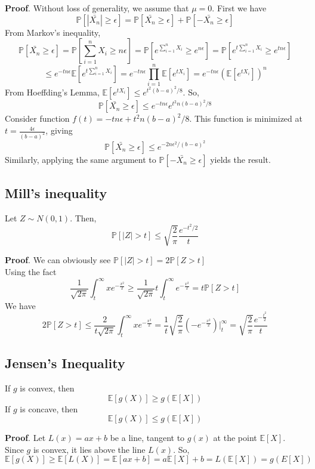 \documentclass[10pt]{article}
\begin{document}
\textbf{Proof}. Without loss of generality, we assume that $\mu=0$. First we have
\[ \mathbb{P}[|\bar{X_n}| \geqslant \epsilon] = \mathbb{P}[\bar{X_n} \geqslant \epsilon]  + \mathbb{P}[-\bar{X_n} \geqslant \epsilon]\] 
From Markov's inequality,
\[ \mathbb{P}[\bar{X_n} \geqslant \epsilon] = \mathbb{P}[\sum_{i=1}^{n} X_i \geqslant n\epsilon] = \mathbb{P}[e^{\sum_{i=1}^{n} X_i} \geqslant e^{n\epsilon}] = \mathbb{P}[e^{t\sum_{i=1}^{n} X_i} \geqslant e^{tn\epsilon}]\]
\[ \leqslant e^{-tn\epsilon} \mathbb{E}[e^{t\sum_{i=1}^{n} X_i}] =  e^{-tn\epsilon} \prod_{i=1}^{n} \mathbb{E}[e^{tX_i}] = e^{-tn\epsilon}  (\mathbb{E}[e^{tX_i}])^n\]
From Hoeffding's Lemma, $\mathbb{E}[e^{tX_i}] \leqslant e^{t^2 (b-a)^2 /8}$. So,
\[ \mathbb{P}[\bar{X_n} \geqslant \epsilon] \leqslant e^{-tn\epsilon}e^{t^2n(b-a)^2 /8}\]
Consider function $f(t) = -tn\epsilon + t^2n(b-a)^2/8$. This function is minimized at $t = \frac{4\epsilon}{(b-a)^2}$, giving
\[ \mathbb{P}[\bar{X_n} \geqslant \epsilon] \leqslant e^{-2n\epsilon^2/(b-a)^2}  \]
Similarly, applying the same argument to $\mathbb{P}[-\bar{X_n} \geqslant \epsilon]$ yields the result.

\subsection*{Mill's inequality}
Let $Z \sim N(0,1)$. Then,
\[ \mathbb{P}[|Z| > t] \leqslant \sqrt{\frac{2}{\pi}} \frac{e^{-t^2/2}}{t} \]

\textbf{Proof}. We can obviously see $\mathbb{P}[|Z|>t]= 2\mathbb{P}[Z>t]$ \\
Using the fact
\[ \frac{1}{\sqrt{2\pi}} \int_{t}^{\infty}xe^{-\frac{x^2}{2}} \geq \frac{1}{\sqrt{2\pi}} t\int_{t}^{\infty}e^{-\frac{x^2}{2}} =t\mathbb{P}[Z>t]\]
We have 
\[2\mathbb{P}[Z>t] \leq \frac{2}{t\sqrt{2\pi}} \int_{t}^{\infty}xe^{-\frac{x^2}{2}}=\frac{1}{t} \sqrt{\frac{2}{\pi}} (-e^{-\frac{x^2}{2}})|_{t}^{\infty}=\sqrt{\frac{2}{\pi}}\frac{e^{-\frac{t^2}{2}}}{t}\]

\subsection*{Jensen's Inequality}
If $g$ is convex, then
\[\mathbb{E}[g(X)] \geqslant g(\mathbb{E}[X]) \]
If $g$ is concave, then
\[\mathbb{E}[g(X)] \leqslant g(\mathbb{E}[X]) \]

\textbf{Proof}. Let $L(x) = ax + b$ be a line, tangent to $g(x)$ at the point $\mathbb{E}[X]$. Since $g$ is convex, it lies above the line $L(x)$. So, 
\[\mathbb{E}[g(X)] \geqslant \mathbb{E}[L(X)] = \mathbb{E}[ax + b]=a\mathbb{E}[X] + b=L(\mathbb{E}[X]) = g(E[X]) \]
\end{document}
